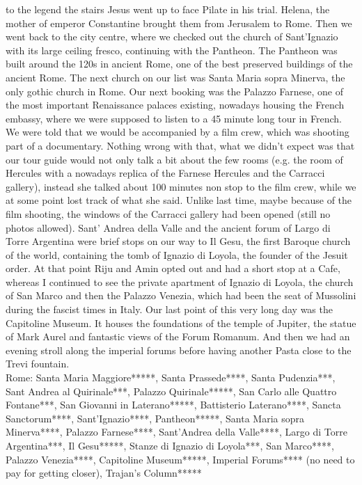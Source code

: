 to the legend the stairs Jesus went up to face Pilate in his trial. Helena, the mother of emperor Constantine brought them from Jerusalem to Rome. Then we went back to the city centre, where we checked out the church of Sant'Ignazio with its large ceiling fresco, continuing with the Pantheon. The Pantheon was built around the 120s in ancient Rome, one of the best preserved buildings of the ancient Rome. The next church on our list was Santa Maria sopra Minerva, the only gothic church in Rome. Our next booking was the Palazzo Farnese, one of the most important Renaissance palaces existing, nowadays housing the French embassy, where we were supposed to listen to a 45 minute long tour in French. We were told that we would be accompanied by a film crew, which was shooting part of a documentary. Nothing wrong with that, what we didn't expect was that our tour guide would not only talk a bit about the few rooms (e.g. the room of Hercules with a nowadays replica of the Farnese Hercules and the Carracci gallery), instead she talked about 100 minutes non stop to the film crew, while we at some point lost track of what she said. Unlike last time, maybe because of the film shooting, the windows of the Carracci gallery had been opened (still no photos allowed). Sant' Andrea della Valle and the ancient forum of Largo di Torre Argentina were brief stops on our way to Il Gesu, the first Baroque church of the world, containing the tomb of Ignazio di Loyola, the founder of the Jesuit order. At that point Riju and Amin opted out and had a short stop at a Cafe, whereas I continued to see the private apartment of Ignazio di Loyola, the church of San Marco and then the Palazzo Venezia, which had been the seat of Mussolini during the fascist times in Italy. Our last point of this very long day was the Capitoline Museum. It houses the foundations of the temple of Jupiter, the statue of Mark Aurel and fantastic views of the Forum Romanum. And then we had an evening stroll along the imperial forums before having another Pasta close to the Trevi fountain. \\

Rome: Santa Maria Maggiore*****, Santa Prassede****, Santa Pudenzia***, Sant Andrea al Quirinale***,  Palazzo Quirinale*****, San Carlo alle Quattro Fontane***,  San Giovanni in Laterano*****,  Battisterio Laterano****, Sancta Sanctorum****,  Sant'Ignazio****,  Pantheon*****,  Santa Maria sopra Minerva****,  Palazzo Farnese****,  Sant'Andrea della Valle****,  Largo di Torre Argentina***, Il Gesu*****,  Stanze di Ignazio di Loyola***,  San Marco****,  Palazzo Venezia****,  Capitoline Museum*****, Imperial Forums**** (no need to pay for getting closer),  Trajan's Column*****\\

